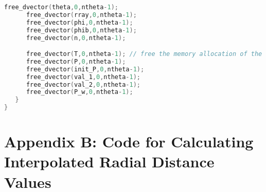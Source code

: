 \documentclass[11pt]{article}
\begin{document}
\begin{footnotesize}
\begin{lstlisting}[language=c,showstringspaces=false]
      free_dvector(theta,0,ntheta-1);
      free_dvector(rray,0,ntheta-1);
      free_dvector(phi,0,ntheta-1);
      free_dvector(phib,0,ntheta-1);
      free_dvector(n,0,ntheta-1);

      free_dvector(T,0,ntheta-1); // free the memory allocation of the T vector
      free_dvector(P,0,ntheta-1);
      free_dvector(init_P,0,ntheta-1);
      free_dvector(val_1,0,ntheta-1); 
      free_dvector(val_2,0,ntheta-1);
      free_dvector(P_w,0,ntheta-1);
   }
}

\end{lstlisting}
\end{footnotesize}


\section*{Appendix B: Code for Calculating Interpolated Radial Distance Values}
\label{app:appendix_B}
\end{document}

